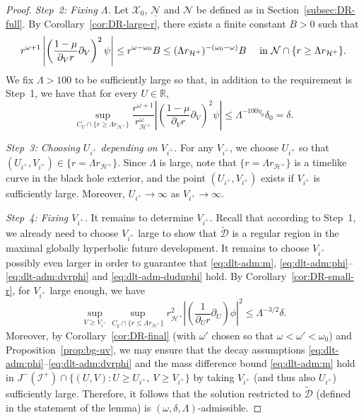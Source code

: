 \documentclass[10pt, reqno]{amsart}
\theoremstyle{definition}
\theoremstyle{remark}
\theoremstyle{conjecture}
\numberwithin{equation}{section}
\newcommand{\set}[1]{\{#1\}}
\newcommand{\rd}{\partial}
\newcommand{\0}{\emptyset}
\newcommand{\dlt}{\delta}
\newcommand{\Lmb}{\Lambda}
\newcommand{\omg}{\omega}
\newcommand{\bbR}{\mathbb R}
\newcommand{\calD}{\mathcal D}
\newcommand{\calH}{\mathcal H}
\newcommand{\calI}{\mathcal I}
\newcommand{\calN}{\mathcal N}
\newcommand{\calX}{\mathcal X}
\newcommand{\uC}{\underline{C}}
\newcommand{\EH}{\calH^{+}}
\newcommand{\pfstep}[1]{\vspace{.5em} {\it \noindent #1.}}
\newcommand{\NI}{\calI^{+}}						%
\newcommand{\Abs}[1]{\left\vert #1 \right\vert}
\begin{document}
\begin{proof}
\pfstep{Step~2: Fixing $\Lambda$} 
Let $\calX_{0}$, $\underline{\calN}$ and $\calN$ be defined as in Section~\ref{subsec:DR-full}. By Corollary~\ref{cor:DR-large-r}, there exists a finite constant $B > 0$ such that
\begin{equation*}
	r^{\omg + 1} \Abs{\left(\frac{1-\mu}{\rd_{V} r} \rd_{V} \right)^{2} \psi} \leq r^{\omg-\omg_{0}} B \leq (\Lmb r_{\EH})^{-(\omg_{0} - \omg)} B \quad \hbox{ in } \calN \cap \set{r \geq \Lmb r_{\EH}}.
\end{equation*}
We fix $\Lmb > 100$ to be sufficiently large so that, in addition to the requirement is Step~1, we have that for every $U \in \bbR$,
\begin{equation*} 
	\sup_{C_{U} \cap \set{r \geq \Lmb r_{\EH}}} \frac{r^{\omg+1}}{r_{\EH}^{\omg}} \Abs{\left(\frac{1-\mu}{\rd_{V} r} \rd_{V} \right)^{2} \psi} \leq \Lmb^{- 100 \eta_{0}} \dlt_{0} = \dlt.
\end{equation*}

\pfstep{Step~3: Choosing $U_{i^{+}}$ depending on $V_{i^{+}}$} For any $V_{i^{+}}$, we choose $U_{i^{+}}$ so that $(U_{i^{+}}, V_{i^{+}}) \in \set{r = \Lmb r_{\EH}}$. Since $\Lmb$ is large, note that $\set{r = \Lmb r_{\EH}}$ is a timelike curve in the black hole exterior, and the point $(U_{i^{+}}, V_{i^{+}})$ exists if $V_{i^{+}}$ is sufficiently large. Moreover, $U_{i^{+}} \to \infty$ as $V_{i^{+}} \to \infty$. 

\pfstep{Step~4: Fixing $V_{i^{+}}$} It remains to determine $V_{i^{+}}$. Recall that according to Step~1, we already need to choose $V_{i^+}$ large to show that $\widetilde{\calD}$ is a regular region in the maximal globally hyperbolic future development. It remains to choose $V_{i^{+}}$ possibly even larger in order to guarantee that \eqref{eq:dlt-adm:m}, \eqref{eq:dlt-adm:phi}--\eqref{eq:dlt-adm:dvrphi} and \eqref{eq:dlt-adm-duduphi} hold. By Corollary~\ref{cor:DR-small-r}, for $V_{i^{+}}$ large enough, we have
\begin{equation*} 
	\sup_{V \geq V_{i^{+}}} \sup_{\uC_{V} \cap \set{r \leq \Lmb r_{\EH}}} r_{\EH}^{2} \Abs{\left(\frac{1}{\rd_{U} r} \rd_{U} \right) \phi}^{2} \leq \Lmb^{-3/2} \dlt.
\end{equation*}
Moreover, by Corollary~\ref{cor:DR-final} (with $\omg'$ chosen so that $\omg < \omg' < \omg_{0}$) and Proposition~\ref{prop:bg-uv}, we may ensure that the decay assumptions \eqref{eq:dlt-adm:phi}--\eqref{eq:dlt-adm:dvrphi} and the mass difference bound \eqref{eq:dlt-adm:m} hold in $J^{-} (\NI) \cap \set{(U, V) : U \geq U_{i^{+}}, \ V \geq V_{i^{+}}}$ by taking $V_{i^{+}}$ (and thus also $U_{i^{+}}$) sufficiently large. Therefore, it follows that the solution restricted to $\widetilde{\calD}$ (defined in the statement of the lemma) is $(\omg, \dlt, \Lmb)$-admissible. \qedhere
\end{proof}
\end{document}

